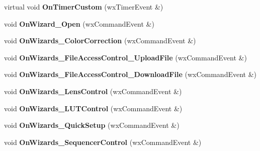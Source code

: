 \begin{DoxyCompactItemize}
\item 
\hypertarget{class_prop_view_frame_a198e5e4179c8e1250cc30e2c04191ad3}{virtual void {\bfseries On\+Timer\+Custom} (wx\+Timer\+Event \&)}\label{class_prop_view_frame_a198e5e4179c8e1250cc30e2c04191ad3}

\item 
\hypertarget{class_prop_view_frame_a382738ee168f7899a4a192df8862a914}{void {\bfseries On\+Wizard\+\_\+\+Open} (wx\+Command\+Event \&)}\label{class_prop_view_frame_a382738ee168f7899a4a192df8862a914}

\item 
\hypertarget{class_prop_view_frame_a80c7d4f89ac293a3f9a9f220bb3867aa}{void {\bfseries On\+Wizards\+\_\+\+Color\+Correction} (wx\+Command\+Event \&)}\label{class_prop_view_frame_a80c7d4f89ac293a3f9a9f220bb3867aa}

\item 
\hypertarget{class_prop_view_frame_a02e507f571a879acd813efdf1c11634d}{void {\bfseries On\+Wizards\+\_\+\+File\+Access\+Control\+\_\+\+Upload\+File} (wx\+Command\+Event \&)}\label{class_prop_view_frame_a02e507f571a879acd813efdf1c11634d}

\item 
\hypertarget{class_prop_view_frame_a5ce017d2b5428743ef7ce41204d69f25}{void {\bfseries On\+Wizards\+\_\+\+File\+Access\+Control\+\_\+\+Download\+File} (wx\+Command\+Event \&)}\label{class_prop_view_frame_a5ce017d2b5428743ef7ce41204d69f25}

\item 
\hypertarget{class_prop_view_frame_a6c5b1dc3217a9b1387de934116cfa137}{void {\bfseries On\+Wizards\+\_\+\+Lens\+Control} (wx\+Command\+Event \&)}\label{class_prop_view_frame_a6c5b1dc3217a9b1387de934116cfa137}

\item 
\hypertarget{class_prop_view_frame_aba1fe4eaec71a6d27370c7012058463e}{void {\bfseries On\+Wizards\+\_\+\+L\+U\+T\+Control} (wx\+Command\+Event \&)}\label{class_prop_view_frame_aba1fe4eaec71a6d27370c7012058463e}

\item 
\hypertarget{class_prop_view_frame_a49760f43e5fcf485c58a968031fd9d00}{void {\bfseries On\+Wizards\+\_\+\+Quick\+Setup} (wx\+Command\+Event \&)}\label{class_prop_view_frame_a49760f43e5fcf485c58a968031fd9d00}

\item 
\hypertarget{class_prop_view_frame_a1af9f63895e44035f6884a12327de3dd}{void {\bfseries On\+Wizards\+\_\+\+Sequencer\+Control} (wx\+Command\+Event \&)}\label{class_prop_view_frame_a1af9f63895e44035f6884a12327de3dd}


\end{DoxyCompactItemize}
